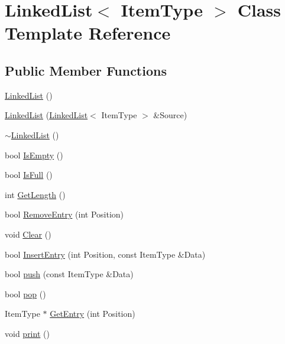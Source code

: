 \hypertarget{class_linked_list}{\section{Linked\-List$<$ Item\-Type $>$ Class Template Reference}
\label{class_linked_list}
}
\subsection*{Public Member Functions}
\begin{DoxyCompactItemize}
\item 
\hyperlink{class_linked_list_adf8d8164e06b6d358a36df7e53e814ee}{Linked\-List} ()
\item 
\hyperlink{class_linked_list_a5f2ab4b02492afc40fb93d9df296a23d}{Linked\-List} (\hyperlink{class_linked_list}{Linked\-List}$<$ Item\-Type $>$ \&Source)
\item 
\hyperlink{class_linked_list_a66aee17d756fe0e002375897383c180b}{$\sim$\-Linked\-List} ()
\item 
bool \hyperlink{class_linked_list_a3b295d42a798af81e47ffbc7722a4814}{Is\-Empty} ()
\item 
bool \hyperlink{class_linked_list_a199d85d5b619a1b8ae5d5ded26aa8dab}{Is\-Full} ()
\item 
int \hyperlink{class_linked_list_af008cafb2c34120ffed6c8ee1264b5de}{Get\-Length} ()
\item 
bool \hyperlink{class_linked_list_a12cac251309838871521918bfd4a2a93}{Remove\-Entry} (int Position)
\item 
void \hyperlink{class_linked_list_aff656daf152f61b026a3db56b512872d}{Clear} ()
\item 
bool \hyperlink{class_linked_list_acccadd7db9522ec209be2bc998477ce8}{Insert\-Entry} (int Position, const Item\-Type \&Data)
\item 
bool \hyperlink{class_linked_list_a347095bb4fb5f725942f1e51a0dc4f5d}{push} (const Item\-Type \&Data)
\item 
bool \hyperlink{class_linked_list_a9b0d447243900fbecf99d345a9bd0177}{pop} ()
\item 
Item\-Type $\ast$ \hyperlink{class_linked_list_a2cc3359498e151904a63088c7137d97a}{Get\-Entry} (int Position)
\item 
void \hyperlink{class_linked_list_a8a35aff8cede3a8f31a2388d377e2a27}{print} ()
\end{DoxyCompactItemize}


